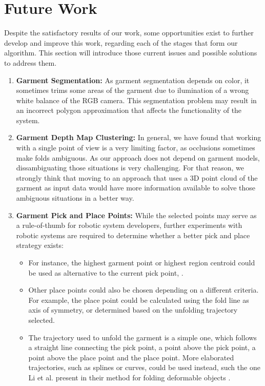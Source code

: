 \section{Future Work}
\label{conclusions:future_work}
Despite the satisfactory results of our work, some opportunities exist to further develop and improve this work, regarding each of the stages that form our algorithm. This section will introduce those current issues and possible solutions to address them.

\begin{enumerate}
	\item \textbf{Garment Segmentation:} As garment segmentation depends on color, it sometimes trims some areas of the garment due to ilumination of a wrong white balance of the RGB camera. This segmentation problem may result in an incorrect polygon approximation that affects the functionality of the system.
	\item \textbf{Garment Depth Map Clustering:} In general, we have found that working with a single point of view is a very limiting factor, as occlusions sometimes make folds ambiguous. As our approach does not depend on garment models, dissambiguating those situations is very challenging. For that reason, we strongly think that moving to an approach that uses a 3D point cloud of the garment as input data would have more information available to solve those ambiguous situations in a better way.

	\item \textbf{Garment Pick and Place Points:} While the selected points may serve as a rule-of-thumb for robotic system developers, further experiments with robotic systems are required to determine whether a better pick and place strategy exists:
	
\begin{itemize}
\item For instance, the highest garment point or highest region centroid could be used as alternative to the current pick point, .

\item Other place points could also be chosen depending on a different criteria. For example, the place point could be calculated using the fold line as axis of symmetry, or determined based on the unfolding trajectory selected.	

\item The trajectory used to unfold the garment is a simple one, which follows a straight line connecting the pick point, a point above the pick point, a point above the place point and the place point. More elaborated trajectories, such as splines or curves, could be used instead, such the one Li et al. present in their method for folding deformable objects \cite{Li2015IROS}.

\end{itemize}
\end{enumerate}

